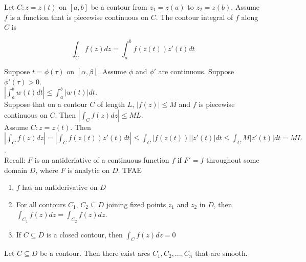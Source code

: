 \documentclass{article}
\theoremstyle{definition}
\begin{document}
Let $C:z=z(t)$ on $[a,b]$ be a contour from $z_1 = z(a)$ to $z_2= z(b)$. Assume $f$ is a function that is piecewise continuous on $C$. The contour integral of $f$ along $C$ is 

$$\int_Cf(z)dz = \int_a^bf(z(t))z'(t)dt$$

Suppose $t = \phi(\tau)$ on $[\alpha,\beta]$. Assume $\phi$ and $\phi'$ are continuous. Suppose $\phi'(\tau) > 0$.\\


 $|\int_a^bw(t)dt| \le \int_a^b|w(t)|dt$.\\

 Suppose that on a contour $C$ of length $L$, $|f(z)|\le M$ and $f$ is piecewise continuous on $C$. Then $|\int_Cf(z)dz|\le ML$.\\

 Assume $C:z = z(t)$. Then $|\int_Cf(z)dz| = |\int_Cf(z(t))z'(t)dt| \le \int_C|f(z(t))||z'(t)|dt \le \int_CM|z'(t)|dt = ML$.\\


 Recall: $F$ is an antideriative of a continuous function $f$ if $F' = f$ throughout some domain $D$, where $F$ is analytic on $D$. TFAE
\begin{enumerate}
    \item $f$ has an antiderivative on $D$
    \item For all contours $C_1$, $C_2\subseteq D$ joining fized points $z_1$ and $z_2$ in $D$, then $\int_{C_1}f(z)dz = \int_{C_2}f(z)dz$.
    \item If $C\subseteq D$ is a closed contour, then $\int_Cf(z)dz = 0$
\end{enumerate}
 Let $C\subseteq D$ be a contour. Then there exist arcs $C_1,C_2,...,C_n$ that are smooth.\\
\end{document}
